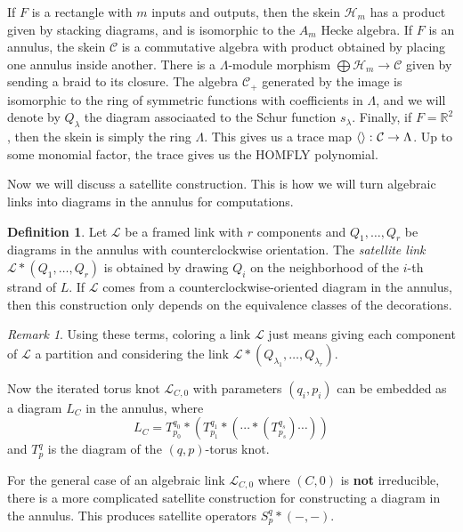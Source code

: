 \documentclass[leqno, openany]{memoir}
\theoremstyle{definition}
\newtheorem{defn}[thm]{Definition}
\theoremstyle{remark}
\newtheorem{rmk}[thm]{Remark}
\theoremstyle{plain}
\theoremstyle{definition}
\theoremstyle{remark}
\newcommand{\R}{\mathbb{R}}
\newcommand{\mc}[1]{\mathcal{#1}}
\newcommand{\1}{\mathbf{1}}
\newcommand{\2}{\mathbf{2}}
\newcommand{\3}{\mathbf{3}}
\begin{document}
If $F$ is a rectangle with $m$ inputs and outputs, then the skein $\mc{H}_m$ has a product given by stacking diagrams, and is isomorphic to the $A_m$ Hecke algebra. If $F$ is an annulus, the skein $\mc{C}$ is a commutative algebra with product obtained by placing one annulus inside another. There is a $\Lambda$-module morphism $\bigoplus \mc{H}_m \to \mc{C}$ given by sending a braid to its closure. The algebra $\mc{C}_+$ generated by the image is isomorphic to the ring of symmetric functions with coefficients in $\Lambda$, and we will denote by $Q_{\lambda}$ the diagram associaated to the Schur function $s_{\lambda}$. Finally, if $F = \R^2$, then the skein is simply the ring $\Lambda$. This gives us a trace map $\ev{} \colon \mc{C} \to \Lambda$. Up to some monomial factor, the trace gives us the HOMFLY polynomial.

Now we will discuss a satellite construction. This is how we will turn algebraic links into diagrams in the annulus for computations.

\begin{defn}
    Let $\mc{L}$ be a framed link with $r$ components and $Q_1, \ldots, Q_r$ be diagrams in the annulus with counterclockwise orientation. The \textit{satellite link} $\mc{L} * (Q_1, \ldots, Q_r)$ is obtained by drawing $Q_i$ on the neighborhood of the $i$-th strand of $L$. If $\mc{L}$ comes from a counterclockwise-oriented diagram in the annulus, then this construction only depends on the equivalence classes of the decorations.
\end{defn}

\begin{rmk}
    Using these terms, coloring a link $\mc{L}$ just means giving each component of $\mc{L}$ a partition and considering the link $\mc{L} * (Q_{\lambda_1}, \ldots, Q_{\lambda_r})$.
\end{rmk}

Now the iterated torus knot $\mc{L}_{C,0}$ with parameters $(q_i, p_i)$ can be embedded as a diagram $L_C$ in the annulus, where
\[ L_C = T_{p_0}^{q_0} * (T_{p_1}^{q_1} * (\cdots * (T_{p_s}^{q_s}) \cdots)) \]
and $T_p^q$ is the diagram of the $(q,p)$-torus knot.

For the general case of an algebraic link $\mc{L}_{C,0}$ where $(C,0)$ is \textbf{not} irreducible, there is a more complicated satellite construction for constructing a diagram in the annulus. This produces satellite operators $S_p^q * (-,-)$.
\end{document}
